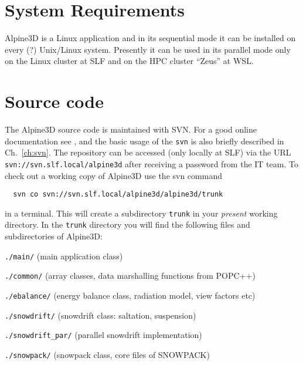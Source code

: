 \documentclass[12pt]{report}
\begin{document}
\section{System Requirements}

Alpine3D is a Linux application and in its sequential mode it can be
installed on every (?) Unix/Linux system. Presently it can be used in
its parallel mode only on the Linux cluster at SLF and on the HPC
cluster ``Zeus'' at WSL.


\section{Source code}

The Alpine3D source code is maintained with SVN. For a good online
documentation see \cite{svn}, and the basic usage of the \verb+svn+ is
also briefly described in Ch.\ \ref{ch:svn}. The repository can be
accessed (only locally at SLF) via the URL
\verb+svn://svn.slf.local/alpine3d+ after receiving a password from
the IT team.  To check out a working copy of Alpine3D use the svn
command
\begin{verbatim}
  svn co svn://svn.slf.local/alpine3d/alpine3d/trunk
\end{verbatim}
in a terminal. This will create a subdirectory \verb+trunk+ in your
{\em present} working directory. In the \verb+trunk+ directory you will find
the following files and subdirectories of Alpine3D:

\verb+./main/+ (main application class)

\verb+./common/+ (array classes, data marshalling functions from POPC++)

\verb+./ebalance/+ (energy balance class, radiation model, view factors
etc)

\verb+./snowdrift/+ (snowdrift class: saltation, suspension)

\verb+./snowdrift_par/+ (parallel snowdrift implementation)

\verb+./snowpack/+ (snowpack class, core files of SNOWPACK)
\end{document}
